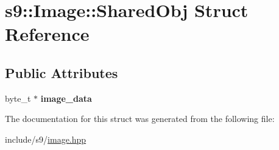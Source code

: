 \hypertarget{structs9_1_1Image_1_1SharedObj}{\section{s9\-:\-:Image\-:\-:Shared\-Obj Struct Reference}
\label{structs9_1_1Image_1_1SharedObj}
}
\subsection*{Public Attributes}
\begin{DoxyCompactItemize}
\item 
\hypertarget{structs9_1_1Image_1_1SharedObj_a1aa593be0f30553d8908d4de9cc2f8f1}{byte\-\_\-t $\ast$ {\bfseries image\-\_\-data}}\label{structs9_1_1Image_1_1SharedObj_a1aa593be0f30553d8908d4de9cc2f8f1}

\end{DoxyCompactItemize}


The documentation for this struct was generated from the following file\-:\begin{DoxyCompactItemize}
\item 
include/s9/\hyperlink{image_8hpp}{image.\-hpp}\end{DoxyCompactItemize}

